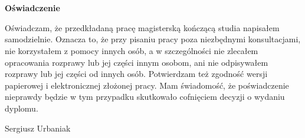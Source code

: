 \setcounter{page}{1}
\chapter*{}

\vspace{1 cm}
\begin{center}                        
\LARGE{ \bf{Oświadczenie}} \\
\end{center}
Oświadczam, że przedkładaną pracę magisterską kończącą studia napisałem samodzielnie. Oznacza to, że przy pisaniu pracy poza niezbędnymi konsultacjami, nie korzystałem z pomocy innych osób, a w szczególności nie zlecałem opracowania rozprawy lub jej części innym osobom, ani nie odpisywałem rozprawy lub jej części od innych osób.
Potwierdzam też zgodność wersji papierowej i elektronicznej złożonej pracy. Mam świadomość, że poświadczenie nieprawdy będzie w tym przypadku skutkowało cofnięciem decyzji o wydaniu dyplomu.
\vspace{3.0cm}
\begin{flushleft}
\hspace{10.0 cm}     Sergiusz Urbaniak\\
\end{flushleft}

\normalsize
